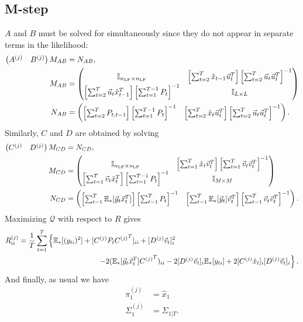 \documentclass[10pt]{article}
\newcommand\nlf{n_{\rm LF}}
\newcommand\e{\mathbb{E}}
\begin{document}
\subsection{M-step}

$A$ and $B$ must be solved for simultaneously since they do not appear in separate terms in the likelihood:
\begin{align}
    \begin{pmatrix} A^{(j)} & B^{(j)} \end{pmatrix} M_{AB} &= N_{AB},\\
    M_{AB} &= \begin{pmatrix}
        \mathbb{I}_{\nlf\times\nlf} & \left[ \sum_{t=2}^T \hat{x}_{t-1} \vec{u}_t^T \right] \left[ \sum_{t=2}^T \vec{u}_t \vec{u}_t^T \right]^{-1}\\
        \left[ \sum_{t=2}^T \vec{u}_t \hat{x}_{t-1}^T \right] \left[ \sum_{t=1}^{T-1} P_t \right]^{-1} & \mathbb{I}_{L\times L}
    \end{pmatrix}\\
    N_{AB} &= \begin{pmatrix}
        \left[ \sum_{t=2}^T P_{t,t-1} \right] \left[ \sum_{t=1}^{T-1} P_t \right]^{-1} & \left[ \sum_{t=2}^T \hat{x}_t \vec{u}_t^T \right] \left[ \sum_{t=2}^T \vec{u}_t \vec{u}_t^T \right]^{-1}
    \end{pmatrix}.
\end{align}
Similarly, $C$ and $D$ are obtained by solving
\begin{align}
    \begin{pmatrix} C^{(j)} & D^{(j)} \end{pmatrix} M_{CD} &= N_{CD},\\
    M_{CD} &= \begin{pmatrix}
        \mathbb{I}_{\nlf\times\nlf} & \left[ \sum_{t=1}^T \hat{x}_t \vec{v}_t^T \right] \left[ \sum_{t=1}^T \vec{v}_t \vec{v}_t^T \right]^{-1}\\
        \left[ \sum_{t=1}^T \vec{v}_t \hat{x}_t^T \right] \left[ \sum_{t=1}^{T-1} P_t \right]^{-1} & \mathbb{I}_{M\times M}
    \end{pmatrix}\\
    N_{CD} &= \begin{pmatrix}
    \left[ \sum_{t=1}^T \e_*[\vec{y}_t \vec{x}_t^T] \right] \left[ \sum_{t=1}^T P_t \right]^{-1} & \left[ \sum_{t=1}^T \e_*[\vec{y}_t] \vec{v}_t^T \right] \left[ \sum_{t=1}^T \vec{v}_t \vec{v}_t^T \right]^{-1}
    \end{pmatrix}.
\end{align}
Maximizing $\mathcal{Q}$ with respect to $R$ gives
\begin{align}
    R_{ii}^{(j)} &= \frac{1}{T} \sum_{t=1}^T \left\{ \e_*[(y_{ti})^2] + [C^{(j)} P_t {C^{(j)}}^T]_{ii} + [D^{(j)} \vec{v}_t]_i^2 \right.\\
    &\hspace{1.5in} \left. -2 (\e_*[\vec{y}_t \vec{x}_t^T] {C^{(j)}}^T)_{ii} - 2 [D^{(j)} \vec{v}_t]_i \e_*[y_{ti}] + 2[C^{(j)} \hat{x}_t]_i [D^{(j)} \vec{v}_t]_i \right\}.
\end{align}
And finally, as usual we have
\begin{align}
    \pi_1^{(j)} &= \hat{x}_1\\
    \Sigma_1^{(j)} &= \Sigma_{1|T}.
\end{align}
\end{document}

